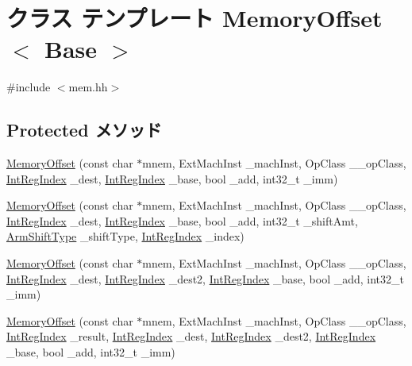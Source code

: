 \hypertarget{classArmISA_1_1MemoryOffset}{
\section{クラス テンプレート MemoryOffset$<$ Base $>$}
\label{classArmISA_1_1MemoryOffset}
}


{\ttfamily \#include $<$mem.hh$>$}\subsection*{Protected メソッド}
\begin{DoxyCompactItemize}
\item 
\hyperlink{classArmISA_1_1MemoryOffset_a0e8da996a9bea28e978dbc7c35ac4b81}{MemoryOffset} (const char $\ast$mnem, ExtMachInst \_\-machInst, OpClass \_\-\_\-opClass, \hyperlink{namespaceArmISA_ae64680ba9fb526106829d6bf92fc791b}{IntRegIndex} \_\-dest, \hyperlink{namespaceArmISA_ae64680ba9fb526106829d6bf92fc791b}{IntRegIndex} \_\-base, bool \_\-add, int32\_\-t \_\-imm)
\item 
\hyperlink{classArmISA_1_1MemoryOffset_a057cba0d375dad66df07fb02c4098c23}{MemoryOffset} (const char $\ast$mnem, ExtMachInst \_\-machInst, OpClass \_\-\_\-opClass, \hyperlink{namespaceArmISA_ae64680ba9fb526106829d6bf92fc791b}{IntRegIndex} \_\-dest, \hyperlink{namespaceArmISA_ae64680ba9fb526106829d6bf92fc791b}{IntRegIndex} \_\-base, bool \_\-add, int32\_\-t \_\-shiftAmt, \hyperlink{namespaceArmISA_a209d79feaaef0aa2f54ae62e53ee90de}{ArmShiftType} \_\-shiftType, \hyperlink{namespaceArmISA_ae64680ba9fb526106829d6bf92fc791b}{IntRegIndex} \_\-index)
\item 
\hyperlink{classArmISA_1_1MemoryOffset_a9ee5e299a2e1a4b8f9661c5b865471cb}{MemoryOffset} (const char $\ast$mnem, ExtMachInst \_\-machInst, OpClass \_\-\_\-opClass, \hyperlink{namespaceArmISA_ae64680ba9fb526106829d6bf92fc791b}{IntRegIndex} \_\-dest, \hyperlink{namespaceArmISA_ae64680ba9fb526106829d6bf92fc791b}{IntRegIndex} \_\-dest2, \hyperlink{namespaceArmISA_ae64680ba9fb526106829d6bf92fc791b}{IntRegIndex} \_\-base, bool \_\-add, int32\_\-t \_\-imm)
\item 
\hyperlink{classArmISA_1_1MemoryOffset_abc78360256aaa85af532182c9b4ee735}{MemoryOffset} (const char $\ast$mnem, ExtMachInst \_\-machInst, OpClass \_\-\_\-opClass, \hyperlink{namespaceArmISA_ae64680ba9fb526106829d6bf92fc791b}{IntRegIndex} \_\-result, \hyperlink{namespaceArmISA_ae64680ba9fb526106829d6bf92fc791b}{IntRegIndex} \_\-dest, \hyperlink{namespaceArmISA_ae64680ba9fb526106829d6bf92fc791b}{IntRegIndex} \_\-dest2, \hyperlink{namespaceArmISA_ae64680ba9fb526106829d6bf92fc791b}{IntRegIndex} \_\-base, bool \_\-add, int32\_\-t \_\-imm)

\end{DoxyCompactItemize}
